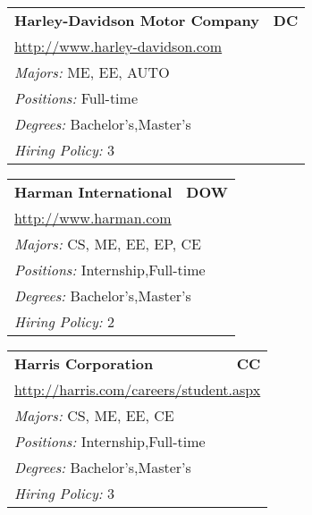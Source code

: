 \documentclass[twoside]{article}
\begin{document}
\begin{center}
\begin{multicols}{3}
\begin{FlushLeft}
\begin{minipage}{.9\columnwidth}
\end{minipage}
 
\begin{minipage}{.9\columnwidth}\begin{tabularx}{.95\columnwidth}{Xr}
                 {\Large\bf Harley-Davidson Motor Company} & {\Large\bf DC}\\
    \multicolumn{2}{p{.95\columnwidth}}{\url{http://www.harley-davidson.com}}\\
    \multicolumn{2}{p{.95\columnwidth}}{\emph{Majors:} ME, EE, AUTO}\\
    \multicolumn{2}{p{.95\columnwidth}}{\emph{Positions:} Full-time}\\
    \multicolumn{2}{p{.95\columnwidth}}{\emph{Degrees:} Bachelor's,Master's}\\
    \multicolumn{2}{p{.95\columnwidth}}{\emph{Hiring Policy:} 3}\\
    \end{tabularx}
    
\end{minipage}
 
\begin{minipage}{.9\columnwidth}\begin{tabularx}{.95\columnwidth}{Xr}
                 {\Large\bf Harman International} & {\Large\bf DOW}\\
    \multicolumn{2}{p{.95\columnwidth}}{\url{http://www.harman.com}}\\
    \multicolumn{2}{p{.95\columnwidth}}{\emph{Majors:} CS, ME, EE, EP, CE}\\
    \multicolumn{2}{p{.95\columnwidth}}{\emph{Positions:} Internship,Full-time}\\
    \multicolumn{2}{p{.95\columnwidth}}{\emph{Degrees:} Bachelor's,Master's}\\
    \multicolumn{2}{p{.95\columnwidth}}{\emph{Hiring Policy:} 2}\\
    \end{tabularx}
    
\end{minipage}
 
\begin{minipage}{.9\columnwidth}\begin{tabularx}{.95\columnwidth}{Xr}
                 {\Large\bf Harris Corporation} & {\Large\bf CC}\\
    \multicolumn{2}{p{.95\columnwidth}}{\url{http://harris.com/careers/student.aspx}}\\
    \multicolumn{2}{p{.95\columnwidth}}{\emph{Majors:} CS, ME, EE, CE}\\
    \multicolumn{2}{p{.95\columnwidth}}{\emph{Positions:} Internship,Full-time}\\
    \multicolumn{2}{p{.95\columnwidth}}{\emph{Degrees:} Bachelor's,Master's}\\
    \multicolumn{2}{p{.95\columnwidth}}{\emph{Hiring Policy:} 3}\\
    \end{tabularx}
    

\end{minipage}
\end{FlushLeft}
\end{multicols}
\end{center}
\end{document}
